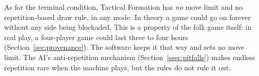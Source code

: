 As for the terminal condition, Tactical Formation has \emph{no} move limit and no
repetition-based draw rule, in any mode. In theory a game could go on forever
without any side being blockaded. This is a property of the folk game itself:
in real play, a four-player game could last three to four hours
(Section~\ref{sec:provenance}). The software keeps it that way and sets no
move limit. The AI's anti-repetition mechanism (Section~\ref{ssec:pitfalls})
makes endless repetition rare when the machine plays, but the rules do not
rule it out.
